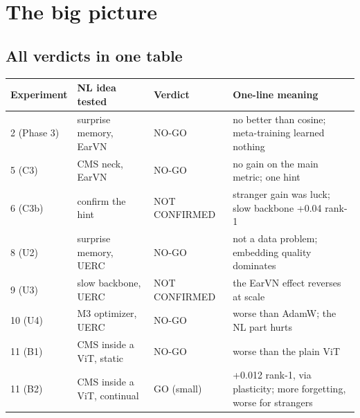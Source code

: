 \documentclass[11pt,a4paper]{article}
\begin{document}
\section{The big picture}

\subsection{All verdicts in one table}
\begin{center}
\begin{tabularx}{\textwidth}{@{}L{2.4cm}L{4.3cm}L{2.4cm}X@{}}
\toprule
\textbf{Experiment} & \textbf{NL idea tested} & \textbf{Verdict} & \textbf{One-line meaning}\\
 (Phase 3) & surprise memory, EarVN & NO-GO & no better than cosine; meta-training learned nothing\\
5 (C3) & CMS neck, EarVN & NO-GO & no gain on the main metric; one hint\\
6 (C3b) & confirm the hint & NOT CONFIRMED & stranger gain was luck; slow backbone +0.04 rank-1\\
8 (U2) & surprise memory, UERC & NO-GO & not a data problem; embedding quality dominates\\
9 (U3) & slow backbone, UERC & NOT CONFIRMED & the EarVN effect reverses at scale\\
10 (U4) & M3 optimizer, UERC & NO-GO & worse than AdamW; the NL part hurts\\
11 (B1) & CMS inside a ViT, static & NO-GO & worse than the plain ViT\\
11 (B2) & CMS inside a ViT, continual & GO (small) & +0.012 rank-1, via plasticity; more forgetting, worse for strangers\\
\bottomrule
\end{tabularx}
\end{center}
\end{document}
